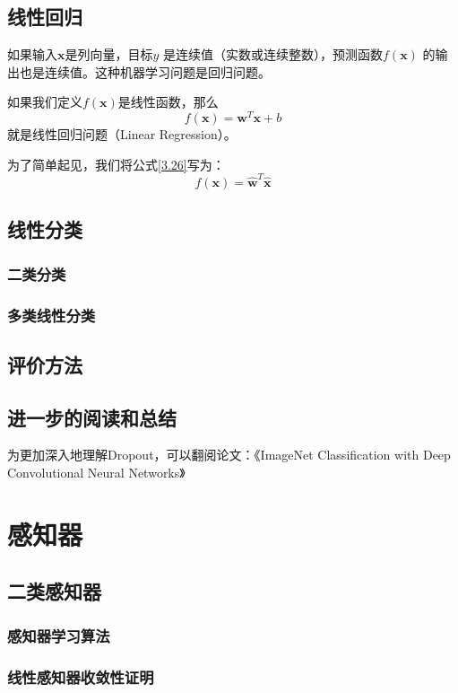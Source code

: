 \documentclass[11pt,fleqn, UTF8]{ctexbook} %
\begin{document}
\section{线性回归}
如果输入$\boldsymbol{x}$是列向量，目标$y$ 是连续值（实数或连续整数），预测函数$f(\boldsymbol{x})$ 的输出也是连续值。这种机器学习问题是回归问题。

如果我们定义$f(\boldsymbol{x})$是线性函数，那么
\begin{equation}\label{3.26}
  f(\boldsymbol{x})=\boldsymbol{w}^T\boldsymbol{x}+b
\end{equation}
就是线性回归问题（Linear Regression）。

为了简单起见，我们将公式\ref{3.26}写为：
\begin{equation}\label{3.27}
  f(\boldsymbol{x})=\hat{\boldsymbol{w}}^T\hat{\boldsymbol{x}}
\end{equation}

\section{线性分类}
\subsection{二类分类}
\subsection{多类线性分类}
\section{评价方法}
\section{进一步的阅读和总结}
为更加深入地理解Dropout，可以翻阅论文：《ImageNet Classification with Deep Convolutional Neural Networks》

\chapter{感知器}
\section{二类感知器}
\subsection{感知器学习算法}
\subsection{线性感知器收敛性证明}
\end{document}
